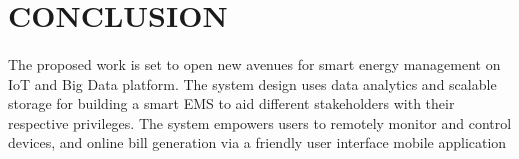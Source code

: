 \documentclass[a4paper,12pt,oneside]{article}
\begin{document}
\newpage
\section{CONCLUSION}
\paragraph{}
The proposed work is set to open new avenues for smart
energy management on IoT and Big Data platform. The
system design uses data analytics and scalable storage for
building a smart EMS to aid different stakeholders with their
respective privileges. The system empowers users to remotely
monitor and control devices, and online bill generation via a
friendly user interface mobile application

\newpage
\end{document}
